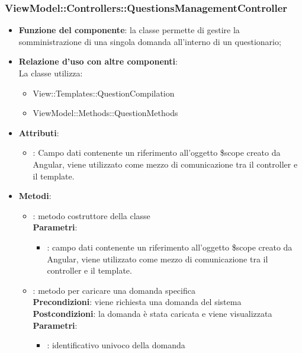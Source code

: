 \subsubsection{ViewModel::Controllers::QuestionsManagementController}
\begin{itemize}
\item\textbf{Funzione del componente}: la classe permette di gestire la somministrazione di una singola domanda all'interno di un questionario;
	\item\textbf{Relazione d'uso con altre componenti}: \\
La classe utilizza:
	\begin{itemize}
		\item View::Templates::QuestionCompilation
		\item ViewModel::Methods::QuestionMethods
	\end{itemize}
\item\textbf{Attributi}:
	\begin{itemize}
		\item{}: Campo dati contenente un riferimento all’oggetto \$scope creato da Angular, viene utilizzato come mezzo di comunicazione tra il controller e il template.\\
	\end{itemize}
\item\textbf{Metodi}:
	\begin{itemize}
		\item{}: metodo costruttore della classe\\
		\textbf{Parametri}:
			\begin{itemize}
				\item{}: campo dati contenente un riferimento all’oggetto \$scope creato da Angular, viene utilizzato come mezzo di comunicazione tra il controller e il template.\\
			\end{itemize}
		\item{}: metodo per caricare una domanda specifica\\
		\textbf{Precondizioni}: viene richiesta una domanda del sistema\\
		\textbf{Postcondizioni}: la domanda è stata caricata e viene visualizzata\\
		\textbf{Parametri}:
			\begin{itemize}
				\item{}: identificativo univoco della domanda\\
			\end{itemize}
	\end{itemize}
\end{itemize}

